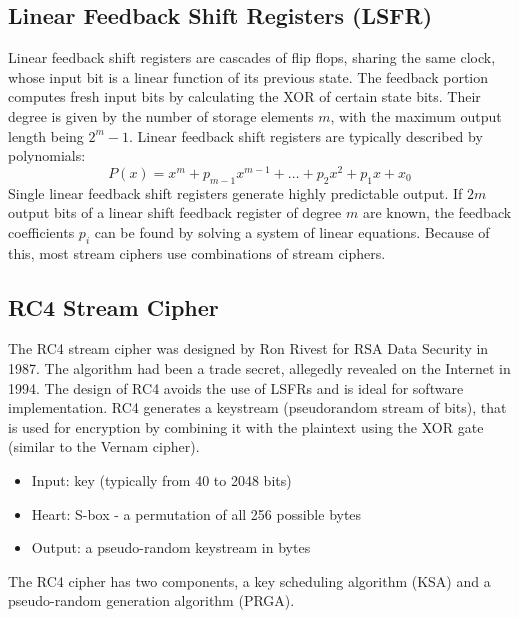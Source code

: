 \documentclass{math}
\begin{document}
\subsection*{Linear Feedback Shift Registers (LSFR)}
Linear feedback shift registers are cascades of flip flops, sharing the same
clock, whose input bit is a linear function of its previous state. The feedback
portion computes fresh input bits by calculating the XOR of certain state bits.
Their degree is given by the number of storage elements \( m \), with the
maximum output length being \( 2^m-1 \). Linear feedback shift registers are
typically described by polynomials:
\[ P(x) = x^m+p_{m-1}x^{m-1}+\dots+p_2x^2+p_1x+x_0 \]
Single linear feedback shift registers generate highly predictable output. If
\( 2m \) output bits of a linear shift feedback register of degree \( m \) are
known, the feedback coefficients \( p_i \) can be found by solving a system of
linear equations. Because of this, most stream ciphers use combinations of
stream ciphers.

\subsection*{RC4 Stream Cipher}
The RC4 stream cipher was designed by Ron Rivest for RSA Data Security in 1987.
The algorithm had been a trade secret, allegedly revealed on the Internet in
1994. The design of RC4 avoids the use of LSFRs and is ideal for software
implementation. RC4 generates a keystream (pseudorandom stream of bits), that is
used for encryption by combining it with the plaintext using the XOR gate
(similar to the Vernam cipher).
\begin{itemize}
  \item Input: key (typically from 40 to 2048 bits)
  \item Heart: S-box - a permutation of all 256 possible bytes
  \item Output: a pseudo-random keystream in bytes
\end{itemize}
The RC4 cipher has two components, a key scheduling algorithm (KSA) and a
pseudo-random generation algorithm (PRGA).
\end{document}
